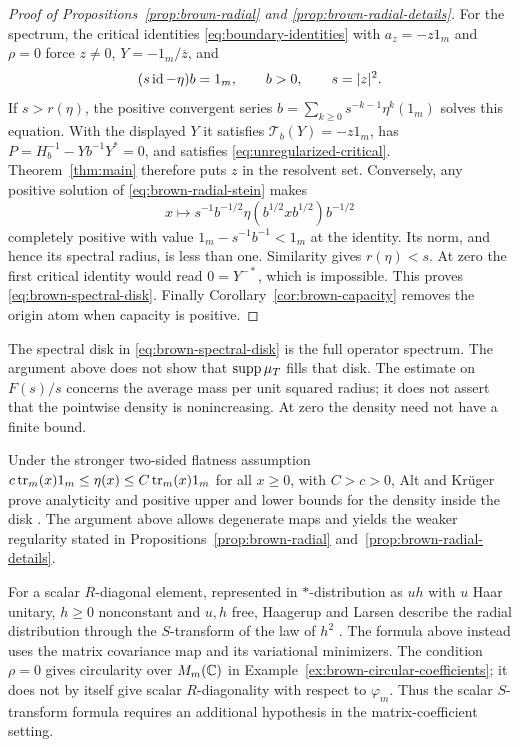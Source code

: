 \begin{proof}[Proof of Propositions~\ref{prop:brown-radial} and
\ref{prop:brown-radial-details}]
For the spectrum, the critical identities \eqref{eq:boundary-identities} with $a_z=-z1_m$ and $\rho=0$ force $z\ne0$, $Y=-1_m/\overline z$, and
\begin{equation}\label{eq:brown-radial-stein}
 (s\operatorname{id}-\eta)b=1_m,\qquad b>0,\qquad s=|z|^2.
\end{equation}
If $s>r(\eta)$, the positive convergent series $b=\sum_{k\ge0}s^{-k-1}\eta^k(1_m)$ solves this equation.
With the displayed $Y$ it satisfies $\mathcal T_b(Y)=-z1_m$, has $P=H_b^{-1}-Yb^{-1}Y^*=0$, and satisfies \eqref{eq:unregularized-critical}.
Theorem~\ref{thm:main} therefore puts $z$ in the resolvent set.
Conversely, any positive solution of \eqref{eq:brown-radial-stein} makes
\[
 x\longmapsto s^{-1}b^{-1/2}\eta(b^{1/2}xb^{1/2})b^{-1/2}
\]
completely positive with value $1_m-s^{-1}b^{-1}<1_m$ at the identity.
Its norm, and hence its spectral radius, is less than one.
Similarity gives $r(\eta)<s$.
At zero the first critical identity would read $0=Y^{-*}$, which is impossible.
This proves \eqref{eq:brown-spectral-disk}.
Finally Corollary~\ref{cor:brown-capacity} removes the origin atom when capacity is positive.
\end{proof}

The spectral disk in \eqref{eq:brown-spectral-disk} is the full operator spectrum.
The argument above does not show that $\operatorname{supp}\mu_T$ fills that disk.
The estimate on $F(s)/s$ concerns the average mass per unit squared radius; it does not assert that the pointwise density is nonincreasing.
At zero the density need not have a finite bound.

Under the stronger two-sided flatness assumption $c\operatorname{tr}_m(x)1_m\le\eta(x)\le C\operatorname{tr}_m(x)1_m$ for all $x\ge0$, with $C>c>0$, Alt and Kr\"uger prove analyticity and positive upper and lower bounds for the density inside the disk \cite[Proposition~2.9 and Theorem~2.5]{AK20}.
The argument above allows degenerate maps and yields the weaker regularity stated in Propositions~\ref{prop:brown-radial} and~\ref{prop:brown-radial-details}.

\begin{remark}
\label{rem:brown-scalar-r-diagonal}
For a scalar $R$-diagonal element, represented in $*$-distribution as $uh$ with $u$ Haar unitary, $h\ge0$ nonconstant and $u,h$ free, Haagerup and Larsen describe the radial distribution through the $S$-transform of the law of $h^2$ \cite[author preprint, Theorem~4.4]{HL00}.
The formula above instead uses the matrix covariance map and its variational minimizers.
The condition $\rho=0$ gives circularity over $M_m(\mathbb C)$ in Example~\ref{ex:brown-circular-coefficients}; it does not by itself give scalar $R$-diagonality with respect to $\varphi_m$.
Thus the scalar $S$-transform formula requires an additional hypothesis in the matrix-coefficient setting.
\end{remark}

